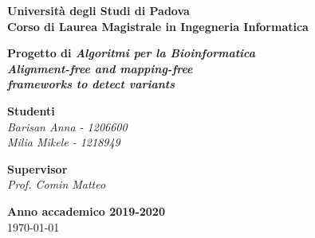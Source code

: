\documentclass[11pt]{article}
\theoremstyle{definition}
\begin{document}
\begin{titlepage}
   \begin{center}
       	\vspace*{1cm}

	   	\textbf{\Large Università degli Studi di Padova\\}
	   	\vspace{0.2cm}
		\textbf{\Large Corso di Laurea Magistrale in Ingegneria Informatica}

		\vspace{5cm}
		\textbf{\huge Progetto di \textit{Algoritmi per la Bioinformatica}\\}
		\vspace{0.5cm}
      	\textbf{\huge \textit{Alignment-free and mapping-free \\}}
      	\vspace{0.2cm}
		\textbf{\huge \textit{frameworks to detect variants}}     
		 	
       	\vspace{6.3cm}

		\begin{Large}
			\begin{flushright}
				\textbf{Studenti\\}
				\textit{Barisan Anna - 1206600\\ Milia Mikele - 1218949}
			\end{flushright}
		\end{Large}
		
       \begin{Large}
			\begin{flushleft}
				\textbf{Supervisor\\}
				\textit{Prof. Comin Matteo}
			\end{flushleft}
		\end{Large}

       \vfill
       \vspace{0.5cm}
            
       \textbf{Anno accademico 2019-2020}\\
       \today
       

\end{center}
\end{titlepage}
\end{document}
